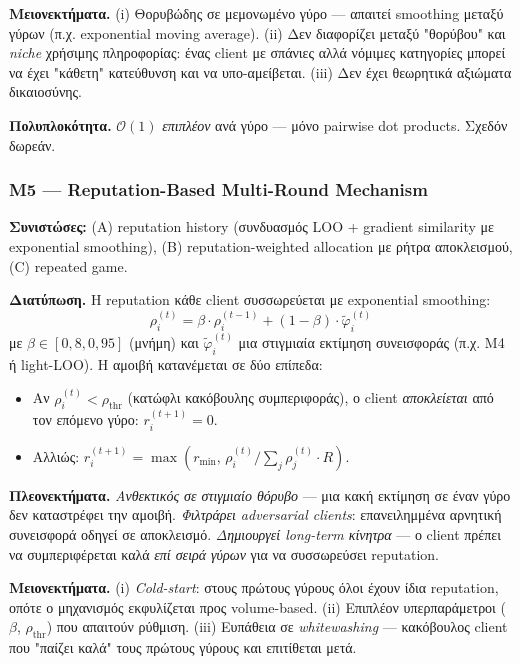\textbf{Μειονεκτήματα.} (i) Θορυβώδης σε μεμονωμένο γύρο — απαιτεί smoothing μεταξύ γύρων (π.χ.
exponential moving average). (ii) Δεν διαφορίζει μεταξύ "θορύβου" και \emph{niche} χρήσιμης
πληροφορίας: ένας client με σπάνιες αλλά νόμιμες κατηγορίες μπορεί να έχει "κάθετη" κατεύθυνση και να
υπο-αμείβεται. (iii) Δεν έχει θεωρητικά αξιώματα δικαιοσύνης.

\textbf{Πολυπλοκότητα.} $\mathcal{O}(1)$ \emph{επιπλέον} ανά γύρο — μόνο pairwise dot products. Σχεδόν
δωρεάν.

\subsubsection{M5 — Reputation-Based Multi-Round Mechanism}
\label{subsubsec:M5_reputation}

\textbf{Συνιστώσες:} (A) reputation history (συνδυασμός LOO + gradient similarity με exponential
smoothing), (B) reputation-weighted allocation με ρήτρα αποκλεισμού, (C) repeated game.

\textbf{Διατύπωση.} Η reputation κάθε client συσσωρεύεται με exponential smoothing:
\begin{equation}
    \rho_i^{(t)} = \beta \cdot \rho_i^{(t-1)} + (1-\beta) \cdot \tilde{\varphi}_i^{(t)}
    \label{eq:M5_reputation}
\end{equation}
με $\beta \in [0{,}8, 0{,}95]$ (μνήμη) και $\tilde{\varphi}_i^{(t)}$ μια στιγμιαία εκτίμηση
συνεισφοράς (π.χ. M4 ή light-LOO). Η αμοιβή κατανέμεται σε δύο επίπεδα:

\begin{itemize}
    \item Αν $\rho_i^{(t)} < \rho_{\text{thr}}$ (κατώφλι κακόβουλης συμπεριφοράς), ο client
    \emph{αποκλείεται} από τον επόμενο γύρο: $r_i^{(t+1)} = 0$.
    \item Αλλιώς: $r_i^{(t+1)} = \max(r_{\min},\, \rho_i^{(t)} / \sum_j \rho_j^{(t)} \cdot R)$.
\end{itemize}

\textbf{Πλεονεκτήματα.} \emph{Ανθεκτικός σε στιγμιαίο θόρυβο} — μια κακή εκτίμηση σε έναν γύρο δεν
καταστρέφει την αμοιβή. \emph{Φιλτράρει adversarial clients}: επανειλημμένα αρνητική συνεισφορά
οδηγεί σε αποκλεισμό. \emph{Δημιουργεί long-term κίνητρα} — ο client πρέπει να συμπεριφέρεται καλά
\emph{επί σειρά γύρων} για να συσσωρεύσει reputation.

\textbf{Μειονεκτήματα.} (i) \emph{Cold-start}: στους πρώτους γύρους όλοι έχουν ίδια reputation,
οπότε ο μηχανισμός εκφυλίζεται προς volume-based. (ii) Επιπλέον υπερπαράμετροι ($\beta$,
$\rho_{\text{thr}}$) που απαιτούν ρύθμιση. (iii) Ευπάθεια σε \emph{whitewashing} — κακόβουλος
client που "παίζει καλά" τους πρώτους γύρους και επιτίθεται μετά.

